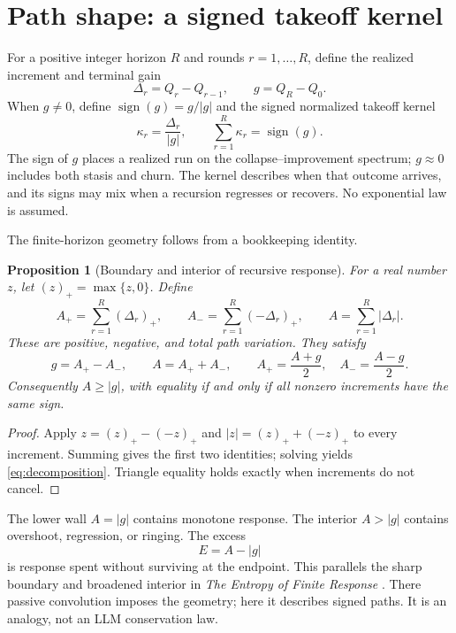 \documentclass[10pt]{article}
\newtheorem{proposition}{Proposition}
\begin{document}
\section{Path shape: a signed takeoff kernel}

For a positive integer horizon $R$ and rounds $r=1,\ldots,R$, define the realized increment and terminal gain
\begin{equation}\label{eq:increments}
\Delta_r=Q_r-Q_{r-1},\qquad g=Q_R-Q_0.
\end{equation}
When $g\ne0$, define $\operatorname{sign}(g)=g/|g|$ and the signed normalized takeoff kernel
\begin{equation}\label{eq:kernel}
\kappa_r=\frac{\Delta_r}{|g|},\qquad
\sum_{r=1}^{R}\kappa_r=\operatorname{sign}(g).
\end{equation}
The sign of $g$ places a realized run on the collapse--improvement spectrum; $g\approx0$ includes both stasis and churn. The kernel describes when that outcome arrives, and its signs may mix when a recursion regresses or recovers. No exponential law is assumed.

The finite-horizon geometry follows from a bookkeeping identity.

\begin{proposition}[Boundary and interior of recursive response]\label{prop:geometry}
For a real number $z$, let $(z)_+=\max\{z,0\}$. Define
\[
A_+=\sum_{r=1}^{R}(\Delta_r)_+,
\qquad A_-=\sum_{r=1}^{R}(-\Delta_r)_+,
\qquad A=\sum_{r=1}^{R}|\Delta_r|.
\]
These are positive, negative, and total path variation. They satisfy
\begin{equation}\label{eq:decomposition}
g=A_+-A_-,\qquad A=A_++A_-,\qquad
A_+=\frac{A+g}{2},\quad A_-=\frac{A-g}{2}.
\end{equation}
Consequently $A\ge |g|$, with equality if and only if all nonzero increments have the same sign.
\end{proposition}

\begin{proof}
Apply $z=(z)_+-(-z)_+$ and $|z|=(z)_++(-z)_+$ to every increment. Summing gives the first two identities; solving yields \eqref{eq:decomposition}. Triangle equality holds exactly when increments do not cancel.
\end{proof}

The lower wall $A=|g|$ contains monotone response. The interior $A>|g|$ contains overshoot, regression, or ringing. The excess
\begin{equation}\label{eq:excess}
E=A-|g|
\end{equation}
is response spent without surviving at the endpoint. This parallels the sharp boundary and broadened interior in \emph{The Entropy of Finite Response} \cite{landersEntropy}. There passive convolution imposes the geometry; here it describes signed paths. It is an analogy, not an LLM conservation law.
\end{document}
